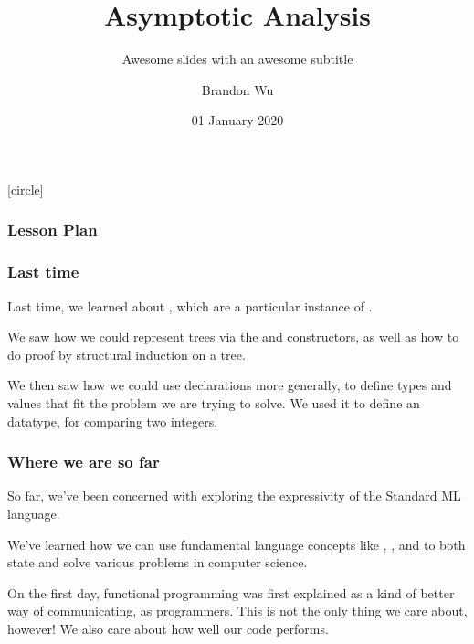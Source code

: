 \documentclass[aspectratio=169]{beamer}
\title{Asymptotic Analysis} %
\subtitle{Awesome slides with an awesome subtitle} %
\date{01 January 2020} %
\author{Brandon Wu} %
\newif\ifcolorlambda
\begin{document}
\ifweb
    \renewcommand{\pause}{}
\fi

[circle]

{
\begin{frame}[plain]
    \colorlambdatrue
    \titlepage
\end{frame}
}

\begin{frame}[fragile]
  \frametitle{Lesson Plan}

  \tableofcontents
\end{frame}

\begin{frame}[fragile]
  \frametitle{Last time}

  Last time, we learned about , which are a particular instance of
  .

  \vspace{\fill}

  We saw how we could represent trees via the  and  
  constructors, as well as how to do proof by structural induction on a tree. 

  \vspace{\fill}

  We then saw how we could use  declarations more generally, to
  define types and values that fit the problem we are trying to solve. We used
  it to define an  datatype, for comparing two integers.
\end{frame}


\begin{frame}[fragile]
  \frametitle{Where we are so far}

  So far, we've been concerned with exploring the expressivity of the Standard ML
  language.

  \vspace{\fill}

  We've learned how we can use fundamental language concepts like 
  , , and 
  to both state and solve various problems in computer science.

  \vspace{\fill}

  On the first day, functional programming was first explained as a kind of 
  better way of communicating, as programmers. This is not the only thing we
  care about, however! We also care about how well our code performs.
\end{frame}
\end{document}
